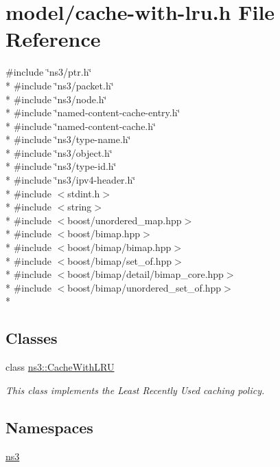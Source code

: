 \hypertarget{cache-with-lru_8h}{\section{model/cache-\/with-\/lru.h File Reference}
\label{cache-with-lru_8h}
}
{\ttfamily \#include \char`\"{}ns3/ptr.\-h\char`\"{}}\\*
{\ttfamily \#include \char`\"{}ns3/packet.\-h\char`\"{}}\\*
{\ttfamily \#include \char`\"{}ns3/node.\-h\char`\"{}}\\*
{\ttfamily \#include \char`\"{}named-\/content-\/cache-\/entry.\-h\char`\"{}}\\*
{\ttfamily \#include \char`\"{}named-\/content-\/cache.\-h\char`\"{}}\\*
{\ttfamily \#include \char`\"{}ns3/type-\/name.\-h\char`\"{}}\\*
{\ttfamily \#include \char`\"{}ns3/object.\-h\char`\"{}}\\*
{\ttfamily \#include \char`\"{}ns3/type-\/id.\-h\char`\"{}}\\*
{\ttfamily \#include \char`\"{}ns3/ipv4-\/header.\-h\char`\"{}}\\*
{\ttfamily \#include $<$stdint.\-h$>$}\\*
{\ttfamily \#include $<$string$>$}\\*
{\ttfamily \#include $<$boost/unordered\-\_\-map.\-hpp$>$}\\*
{\ttfamily \#include $<$boost/bimap.\-hpp$>$}\\*
{\ttfamily \#include $<$boost/bimap/bimap.\-hpp$>$}\\*
{\ttfamily \#include $<$boost/bimap/set\-\_\-of.\-hpp$>$}\\*
{\ttfamily \#include $<$boost/bimap/detail/bimap\-\_\-core.\-hpp$>$}\\*
{\ttfamily \#include $<$boost/bimap/unordered\-\_\-set\-\_\-of.\-hpp$>$}\\*
\subsection*{Classes}
\begin{DoxyCompactItemize}
\item 
class \hyperlink{classns3_1_1CacheWithLRU}{ns3\-::\-Cache\-With\-L\-R\-U}
\begin{DoxyCompactList}\small\item\em This class implements the Least Recently Used caching policy. \end{DoxyCompactList}\end{DoxyCompactItemize}
\subsection*{Namespaces}
\begin{DoxyCompactItemize}
\item 
\hyperlink{namespacens3}{ns3}
\end{DoxyCompactItemize}
